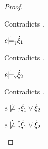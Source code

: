 \begin{proof}
\begin{byCases}
\begin{byCases}
\begin{byCases}
            \begin{byCases}
              \item[\text{(\ref{rule:RXOr})}]
              \begin{pfsteps}
              \item {}  
              \item {} 
              \end{pfsteps} 
              Contradicts .
            \end{byCases}
        \item[\text{(\ref{rule:CMSOr1})}]
            \begin{pfsteps*}
            \item $e \dot{\models}_{?} \dot{\xi}_1$ 
            \end{pfsteps*}
            Contradicts .
        \item[\text{(\ref{rule:CMSOr2})}]
            \begin{pfsteps*}
            \item $e \dot{\models}_{?} \dot{\xi}_2$ 
            \end{pfsteps*}
            Contradicts .
        \end{byCases}
        \begin{pfsteps*}
        \item $\cnotmaysatisfy{e}{\cor{\hxi_1}{\hxi_2}}$  
        \item $\cnotsatisfyormay{e}{\cor{\hxi_1}{\hxi_2}}$ 
        \end{pfsteps*}
        

\end{byCases}
\end{byCases}
\end{proof}
